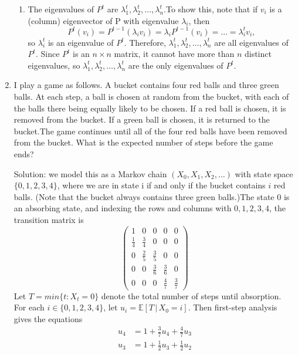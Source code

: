 \documentclass[11pt,a4paper]{report}
\begin{document}
\begin{enumerate}
\begin{enumerate}
            \item The eigenvalues of $P^t$ are $\lambda_1^t, \lambda_2^t,\ldots,\lambda_n^t$.To show this, note that if $v_i$ is a (column) eigenvector of P with eigenvalue $\lambda_i$, then $$P^t(v_i) = P^{t-1}(\lambda_iv_i)=\lambda_iP^{t-1}(v_i)=\ldots=\lambda_i^tv_i,$$ so $\lambda_i^t$ is an eigenvalue of $P^t$. Therefore, $\lambda_1^t, \lambda_2^t,\ldots,\lambda_n^t$ are all eigenvalues of $P^t$. Since $P^t$ is an $n\times n$ matrix, it cannot have more than $n$ distinct eigenvalues, so $\lambda_1^t,\lambda_2^t,\ldots,\lambda_n^t$ are the only eigenvalues of $P^t$.
        \end{enumerate}
        \item I play a game as follows. A bucket contains four red balls and three green balls. At each step, a ball is chosen at random from the bucket, with each of the balls there being equally likely to be chosen. If a red ball is chosen, it is removed from the bucket. If a green ball is chosen, it is returned to the bucket.The game continues until all of the four red balls have been removed from the bucket. What is the expected number of steps before the game ends?\par
        Solution: we model this as a Markov chain $(X_0, X_1, X_2,\ldots)$ with state space $\{0, 1, 2, 3, 4\}$, where we are in state i if and only if the bucket contains $i$ red balls. (Note that the bucket always contains three green balls.)The state $0$ is an absorbing state, and indexing the rows and columns with $0, 1, 2, 3, 4$, the transition matrix is
        $$
        \begin{pmatrix}
            1 & 0 & 0 & 0 & 0\\
            \frac{1}{4} & \frac{3}{4} & 0 & 0 & 0\\
            0 & \frac{2}{5} & \frac{3}{5} & 0 & 0\\
            0 & 0 & \frac{3}{6} & \frac{3}{6} & 0\\
            0 & 0 & 0 & \frac{4}{7} & \frac{3}{7}
        \end{pmatrix}
        $$
        Let $T = min\{t : X_t = 0\}$ denote the total number of steps until absorption. For each $i \in \{0, 1, 2, 3, 4\}$, let $u_i = \mathbb{E}[T\,|\, X_0 = i]$. Then first-step analysis gives the equations
        \begin{align*}
            u_4 &= 1+\frac{3}{7}u_4+\frac{4}{7}u_3\\
            u_3 &= 1+\frac{1}{2}u_3+\frac{1}{2}u_2\\

\end{align*}
\end{enumerate}
\end{document}
